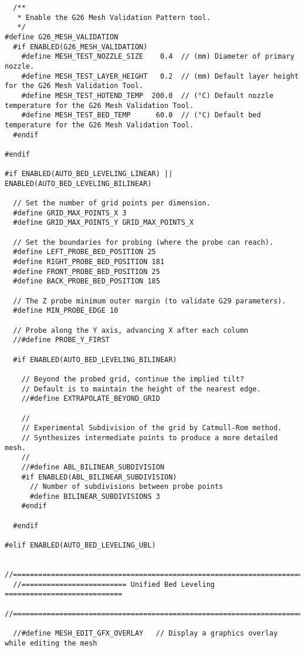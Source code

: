 \begin{lstlisting}
  /**
   * Enable the G26 Mesh Validation Pattern tool.
   */
#define G26_MESH_VALIDATION
  #if ENABLED(G26_MESH_VALIDATION)
    #define MESH_TEST_NOZZLE_SIZE    0.4  // (mm) Diameter of primary nozzle.
    #define MESH_TEST_LAYER_HEIGHT   0.2  // (mm) Default layer height for the G26 Mesh Validation Tool.
    #define MESH_TEST_HOTEND_TEMP  200.0  // (°C) Default nozzle temperature for the G26 Mesh Validation Tool.
    #define MESH_TEST_BED_TEMP      60.0  // (°C) Default bed temperature for the G26 Mesh Validation Tool.
  #endif

#endif

#if ENABLED(AUTO_BED_LEVELING_LINEAR) || ENABLED(AUTO_BED_LEVELING_BILINEAR)

  // Set the number of grid points per dimension.
  #define GRID_MAX_POINTS_X 3
  #define GRID_MAX_POINTS_Y GRID_MAX_POINTS_X

  // Set the boundaries for probing (where the probe can reach).
  #define LEFT_PROBE_BED_POSITION 25
  #define RIGHT_PROBE_BED_POSITION 181
  #define FRONT_PROBE_BED_POSITION 25
  #define BACK_PROBE_BED_POSITION 185

  // The Z probe minimum outer margin (to validate G29 parameters).
  #define MIN_PROBE_EDGE 10

  // Probe along the Y axis, advancing X after each column
  //#define PROBE_Y_FIRST

  #if ENABLED(AUTO_BED_LEVELING_BILINEAR)

    // Beyond the probed grid, continue the implied tilt?
    // Default is to maintain the height of the nearest edge.
    //#define EXTRAPOLATE_BEYOND_GRID

    //
    // Experimental Subdivision of the grid by Catmull-Rom method.
    // Synthesizes intermediate points to produce a more detailed mesh.
    //
    //#define ABL_BILINEAR_SUBDIVISION
    #if ENABLED(ABL_BILINEAR_SUBDIVISION)
      // Number of subdivisions between probe points
      #define BILINEAR_SUBDIVISIONS 3
    #endif

  #endif

#elif ENABLED(AUTO_BED_LEVELING_UBL)

  //===========================================================================
  //========================= Unified Bed Leveling ============================
  //===========================================================================

  //#define MESH_EDIT_GFX_OVERLAY   // Display a graphics overlay while editing the mesh


\end{lstlisting}
